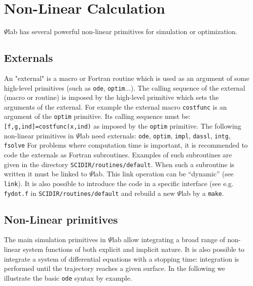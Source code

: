 \section{Non-Linear Calculation}
\label{ch6}

	$\Psi$lab has several powerful non-linear primitives for simulation
or optimization.
\subsection{Externals}
An "external" is a macro or Fortran routine which is used as an argument
of some high-level primitives (such as {\tt ode}, {\tt optim}...).
The calling sequence of the external (macro or routine) is imposed by
the high-level primitive which sets the arguments of the external.
For example the external macro {\tt costfunc} is an argument of 
the {\tt optim} primitive. Its calling sequence must be: 
{\tt [f,g,ind]=costfunc(x,ind)} as imposed by the {\tt optim} primitive.
The following non-linear primitives in $\Psi$lab need externals: 
{\tt ode}, {\tt optim}, {\tt impl}, {\tt dassl}, {\tt intg}, {\tt fsolve}
For problems where computation time is important, it is recommended
to code the externals as Fortran subroutines. Examples of such
subroutines are given in the directory {\tt SCIDIR/routines/default}.
When such a subroutine is written it must be linked to $\Psi$lab.
This link operation can be ``dynamic'' (see {\tt link}). It is
also possible to introduce the code in a specific interface (see e.g.
{\tt fydot.f} in {\tt SCIDIR/routines/default} and rebuild a new $\Psi$lab
by a {\tt make}.

\subsection{Non-Linear primitives}
The main simulation primitives
in $\Psi$lab allow integrating a broad range of non-linear system functions of
both explicit and implicit nature. It is also possible to integrate
a system of differential equations with a stopping time: 
integration is performed until the trajectory reaches a given surface.
In the following we illustrate the basic {\tt ode} syntax by example.

